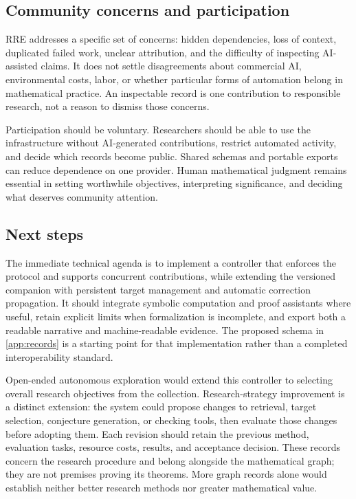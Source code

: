 \subsection{Community concerns and participation}

RRE addresses a specific set of concerns: hidden dependencies, loss of context, duplicated failed work, unclear attribution, and the difficulty of inspecting AI-assisted claims. It does not settle disagreements about commercial AI, environmental costs, labor, or whether particular forms of automation belong in mathematical practice. An inspectable record is one contribution to responsible research, not a reason to dismiss those concerns.

Participation should be voluntary. Researchers should be able to use the infrastructure without AI-generated contributions, restrict automated activity, and decide which records become public. Shared schemas and portable exports can reduce dependence on one provider. Human mathematical judgment remains essential in setting worthwhile objectives, interpreting significance, and deciding what deserves community attention.

\subsection{Next steps}

The immediate technical agenda is to implement a controller that enforces the protocol and supports concurrent contributions, while extending the versioned companion with persistent target management and automatic correction propagation. It should integrate symbolic computation and proof assistants where useful, retain explicit limits when formalization is incomplete, and export both a readable narrative and machine-readable evidence. The proposed schema in \cref{app:records} is a starting point for that implementation rather than a completed interoperability standard.

Open-ended autonomous exploration would extend this controller to selecting overall research objectives from the collection. Research-strategy improvement is a distinct extension: the system could propose changes to retrieval, target selection, conjecture generation, or checking tools, then evaluate those changes before adopting them. Each revision should retain the previous method, evaluation tasks, resource costs, results, and acceptance decision. These records concern the research procedure and belong alongside the mathematical graph; they are not premises proving its theorems. More graph records alone would establish neither better research methods nor greater mathematical value.

